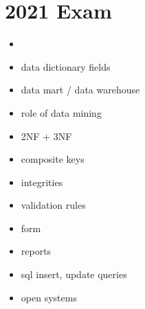\documentclass[12pt, a4, twoside]{article}
\begin{document}
\section{2021 Exam} 
\begin{center}

  \begin{itemize}
    \item 
  \end{itemize}
\end{center}

\begin{itemize}
  \item data dictionary fields 
  \item data mart / data warehouse
  \item role of data mining
  \item 2NF + 3NF 
  \item composite keys
  \item integrities 
  \item validation rules
  \item form 
  \item reports 
  \item sql insert, update queries 
  \item open systems 
\end{itemize} 
\end{document}
